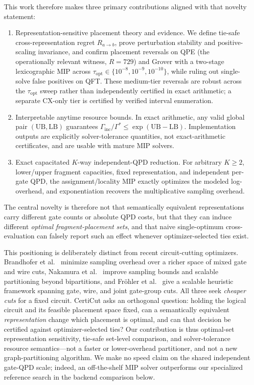 \documentclass[11pt]{article}
\newcommand{\CertiCut}{CertiCut}
\newcommand{\CertiCut}{\textsc{CertiCut}}
\newcommand{\LB}{\mathrm{LB}}
\newcommand{\UB}{\mathrm{UB}}
\begin{document}
This work therefore makes three primary contributions aligned with that novelty statement:
\begin{enumerate}
  \item Representation-sensitive placement theory and evidence. We define tie-safe cross-representation regret $R_{a\to b}$, prove perturbation stability and positive-scaling invariance, and confirm placement reversals on QPE (the operationally relevant witness, $R=729$) and Grover with a two-stage lexicographic MIP across $\tau_{\mathrm{opt}}\in\{10^{-8},10^{-9},10^{-10}\}$, while ruling out single-solve false positives on QFT. These medium-tier reversals are robust across the $\tau_{\mathrm{opt}}$ sweep rather than independently certified in exact arithmetic; a separate CX-only tier is certified by verified interval enumeration.

  \item Interpretable anytime resource bounds. In exact arithmetic, any valid global pair $(\UB,\LB)$ guarantees $\Gamma_{\mathrm{inc}}/\Gamma^*\leq\exp(\UB-\LB)$. Implementation outputs are explicitly solver-tolerance quantities, not exact-arithmetic certificates, and are usable with mature MIP solvers.

  \item Exact capacitated $K$-way independent-QPD reduction. For arbitrary $K\geq2$, lower/upper fragment capacities, fixed representation, and independent per-gate QPD, the assignment/locality MIP exactly optimizes the modeled log-overhead, and exponentiation recovers the multiplicative sampling overhead.
\end{enumerate}
The central novelty is therefore not that semantically equivalent representations carry different gate counts or absolute QPD costs, but that they can induce different \emph{optimal fragment-placement sets}, and that naive single-optimum cross-evaluation can falsely report such an effect whenever optimizer-selected ties exist.

This positioning is deliberately distinct from recent circuit-cutting optimizers. Brandhofer et al.~\cite{brandhofer2024} minimize sampling overhead over a richer space of mixed gate and wire cuts, Nakamura et al.~\cite{nakamura2025} improve sampling bounds and scalable partitioning beyond bipartitions, and Fr{\"o}hler et al.~\cite{frohler2026} give a scalable heuristic framework spanning gate, wire, and joint gate-group cuts. All three seek \emph{cheaper cuts} for a fixed circuit. \CertiCut{} asks an orthogonal question: holding the logical circuit and its feasible placement space fixed, can a semantically equivalent \emph{representation} change which placement is optimal, and can that decision be certified against optimizer-selected ties? Our contribution is thus optimal-set representation sensitivity, tie-safe set-level comparison, and solver-tolerance resource semantics---not a faster or lower-overhead partitioner, and not a new graph-partitioning algorithm. We make no speed claim on the shared independent gate-QPD scale; indeed, an off-the-shelf MIP solver outperforms our specialized reference search in the backend comparison below.
\end{document}
